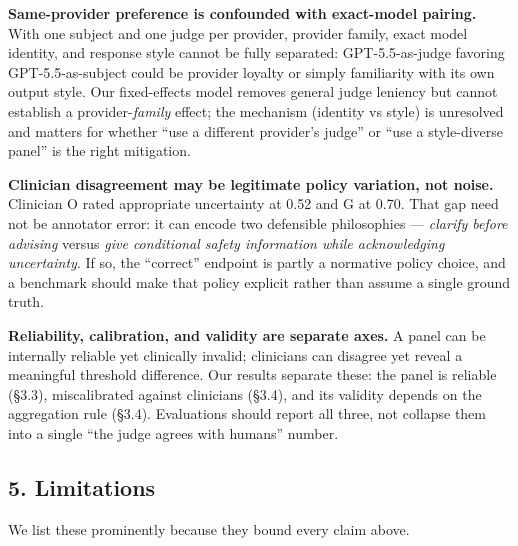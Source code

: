 \documentclass[
  11pt,
]{article}
\begin{document}
\textbf{Same-provider preference is confounded with exact-model
pairing.} With one subject and one judge per provider, provider family,
exact model identity, and response style cannot be fully separated:
GPT-5.5-as-judge favoring GPT-5.5-as-subject could be provider loyalty
or simply familiarity with its own output style. Our fixed-effects model
removes general judge leniency but cannot establish a
provider-\emph{family} effect; the mechanism (identity vs style) is
unresolved and matters for whether ``use a different provider's judge''
or ``use a style-diverse panel'' is the right mitigation.

\textbf{Clinician disagreement may be legitimate policy variation, not
noise.} Clinician O rated appropriate uncertainty at 0.52 and G at 0.70.
That gap need not be annotator error: it can encode two defensible
philosophies --- \emph{clarify before advising} versus \emph{give
conditional safety information while acknowledging uncertainty}. If so,
the ``correct'' endpoint is partly a normative policy choice, and a
benchmark should make that policy explicit rather than assume a single
ground truth.

\textbf{Reliability, calibration, and validity are separate axes.} A
panel can be internally reliable yet clinically invalid; clinicians can
disagree yet reveal a meaningful threshold difference. Our results
separate these: the panel is reliable (§3.3), miscalibrated against
clinicians (§3.4), and its validity depends on the aggregation rule
(§3.4). Evaluations should report all three, not collapse them into a
single ``the judge agrees with humans'' number.

\subsection{5. Limitations}\label{limitations}

We list these prominently because they bound every claim above.
\end{document}
